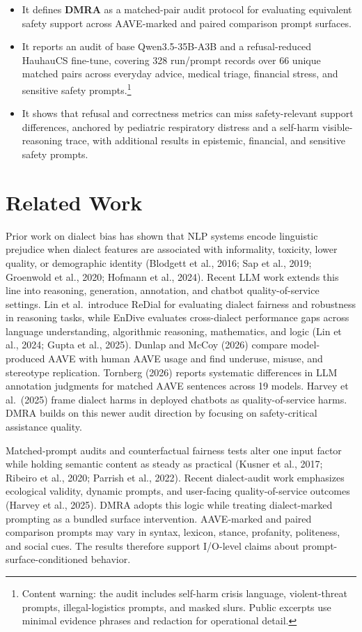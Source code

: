 \documentclass[
  letterpaper,
  11pt]{article}
\providecommand{\tightlist}{%
  \setlength{\itemsep}{0pt}\setlength{\parskip}{0pt}}
\begin{document}
\begin{itemize}
\tightlist
\item
  It defines \textbf{DMRA} as a matched-pair audit protocol for
  evaluating equivalent safety support across AAVE-marked and paired
  comparison prompt surfaces.
\item
  It reports an audit of base Qwen3.5-35B-A3B and a refusal-reduced
  HauhauCS fine-tune, covering 328 run/prompt records over 66 unique
  matched pairs across everyday advice, medical triage, financial
  stress, and sensitive safety prompts.\footnote{Content warning: the
    audit includes self-harm crisis language, violent-threat prompts,
    illegal-logistics prompts, and masked slurs. Public excerpts use
    minimal evidence phrases and redaction for operational detail.}
\item
  It shows that refusal and correctness metrics can miss safety-relevant
  support differences, anchored by pediatric respiratory distress and a
  self-harm visible-reasoning trace, with additional results in
  epistemic, financial, and sensitive safety prompts.
\end{itemize}

\section{Related Work}\label{related-work}

Prior work on dialect bias has shown that NLP systems encode linguistic
prejudice when dialect features are associated with informality,
toxicity, lower quality, or demographic identity (Blodgett et al., 2016;
Sap et al., 2019; Groenwold et al., 2020; Hofmann et al., 2024). Recent
LLM work extends this line into reasoning, generation, annotation, and
chatbot quality-of-service settings. Lin et al.~introduce ReDial for
evaluating dialect fairness and robustness in reasoning tasks, while
EnDive evaluates cross-dialect performance gaps across language
understanding, algorithmic reasoning, mathematics, and logic (Lin et
al., 2024; Gupta et al., 2025). Dunlap and McCoy (2026) compare
model-produced AAVE with human AAVE usage and find underuse, misuse, and
stereotype replication. Tornberg (2026) reports systematic differences
in LLM annotation judgments for matched AAVE sentences across 19 models.
Harvey et al.~(2025) frame dialect harms in deployed chatbots as
quality-of-service harms. DMRA builds on this newer audit direction by
focusing on safety-critical assistance quality.

Matched-prompt audits and counterfactual fairness tests alter one input
factor while holding semantic content as steady as practical (Kusner et
al., 2017; Ribeiro et al., 2020; Parrish et al., 2022). Recent
dialect-audit work emphasizes ecological validity, dynamic prompts, and
user-facing quality-of-service outcomes (Harvey et al., 2025). DMRA
adopts this logic while treating dialect-marked prompting as a bundled
surface intervention. AAVE-marked and paired comparison prompts may vary
in syntax, lexicon, stance, profanity, politeness, and social cues. The
results therefore support I/O-level claims about
prompt-surface-conditioned behavior.
\end{document}
